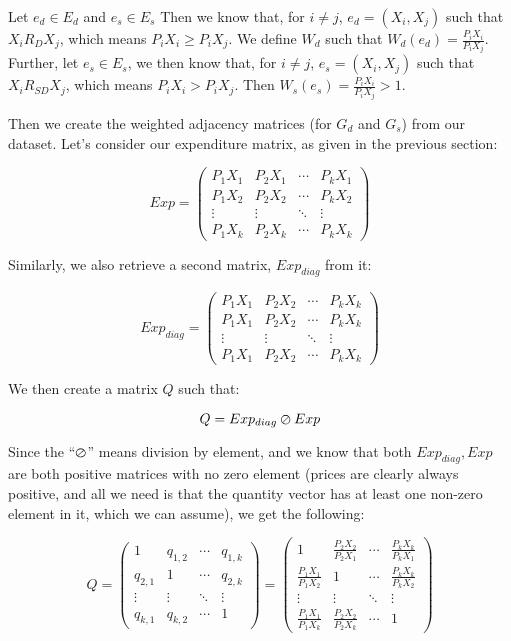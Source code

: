 \documentclass{article} %
\begin{document}
Let $e_d \in E_d$ and $e_s\in E_s$ Then we know that, for $i\not=j$, $e_d=(X_i, X_j)$ such that $X_i R_D X_j$, which means $P_iX_i\geq P_iX_j$. We define $W_d$ such that $W_d(e_d)=\frac{P_iX_i}{P_iX_j}$. Further, let $e_s\in E_s$, we then know that, for $i\not=j$, $e_s=(X_i, X_j)$ such that $X_i R_{SD} X_j$, which means $P_iX_i>P_iX_j$. Then $W_s(e_s)=\frac{P_iX_i}{P_iX_j}>1$.
\bigskip

Then we create the weighted adjacency matrices (for $G_d$ and $G_s$) from our dataset. Let's consider our expenditure matrix, as given in the previous section:

\[
Exp = 
 \begin{pmatrix}
  P_1X_1 & P_2X_1 & \cdots & P_kX_1 \\
  P_1X_2 & P_2X_2 & \cdots & P_kX_2 \\
  \vdots  & \vdots  & \ddots & \vdots  \\
  P_1X_k & P_2X_k & \cdots & P_kX_k
 \end{pmatrix}
\]

Similarly, we also retrieve a second matrix, $Exp_{diag}$ from it:

\[
Exp_{diag} = 
 \begin{pmatrix}
  P_1X_1 & P_2X_2 & \cdots & P_kX_k \\
  P_1X_1 & P_2X_2 & \cdots & P_kX_k \\
  \vdots  & \vdots  & \ddots & \vdots  \\
  P_1X_1 & P_2X_2 & \cdots & P_kX_k
 \end{pmatrix}
\]

We then create a matrix $Q$ such that:

\[
Q = Exp_{diag} \varoslash Exp
\]

Since the ``$\varoslash$'' means division by element, and we know that both $Exp_{diag}, Exp$ are both positive matrices with no zero element (prices are clearly always positive, and all we need is that the quantity vector has at least one non-zero element in it, which we can assume), we get the following:

\[
Q = 
 \begin{pmatrix}
  1 & q_{1,2} & \cdots & q_{1,k} \\
  q_{2,1} & 1 & \cdots & q_{2,k} \\
  \vdots & \vdots & \ddots & \vdots \\
  q_{k,1} & q_{k,2} & \cdots & 1
 \end{pmatrix} =
 \begin{pmatrix}
 1 & \frac{P_2X_2}{P_2X_1} & \cdots & \frac{P_kX_k}{P_kX_1} \\[6pt]
 \frac{P_1X_1}{P_1X_2} & 1 & \cdots & \frac{P_kX_k}{P_kX_2} \\[6pt]
 \vdots & \vdots & \ddots & \vdots \\[6pt]
 \frac{P_1X_1}{P_1X_k} & \frac{P_2X_2}{P_2X_k} & \cdots & 1
 \end{pmatrix}
\]
\end{document}
